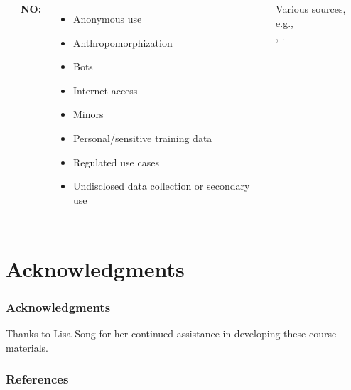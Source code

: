 \documentclass[11pt,
               aspectratio=169,
               hyperref={colorlinks}
               ]{beamer}
\begin{document}
\begin{frame}[t]
\begin{columns}
\begin{columns}
					\end{columns}
			
					\textbf{NO:}
					\begin{itemize}\tiny
						\item Anonymous use
						\item Anthropomorphization 
						\item Bots
						\item Internet access
						\item Minors
						\item Personal/sensitive training data
						\item Regulated use cases
						\item Undisclosed data collection or secondary use
					\end{itemize}
					\vspace{5pt}
					\tiny{Various sources, e.g.,\\ \cite{weidinger2022taxonomy}, \cite{ai2024artificial}.}
					
			\end{columns}
					
		\end{frame}	

	\section{Acknowledgments} 
	
		\begin{frame}
			
			\frametitle{Acknowledgments}
			
			Thanks to Lisa Song for her continued assistance in developing these course materials.
			
		\end{frame}	


		
		\begin{frame}[t, allowframebreaks]
		
			\frametitle{References}	
					
			\printbibliography
			
		\end{frame}
\end{document}
